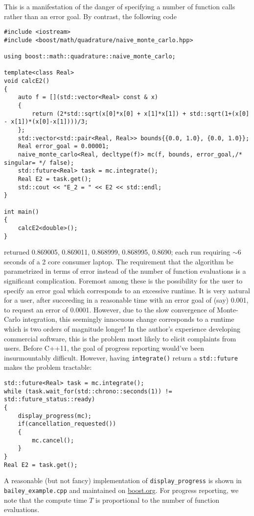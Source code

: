 \documentclass{ansarticle}
\begin{document}
This is a manifestation of the danger of specifying a number of function calls rather than an error goal.
By contrast, the following code
\begin{verbatim}
#include <iostream>
#include <boost/math/quadrature/naive_monte_carlo.hpp>

using boost::math::quadrature::naive_monte_carlo;

template<class Real>
void calcE2()
{
    auto f = [](std::vector<Real> const & x)
    {
        return (2*std::sqrt(x[0]*x[0] + x[1]*x[1]) + std::sqrt(1+(x[0] - x[1])*(x[0]-x[1])))/3;
    };
    std::vector<std::pair<Real, Real>> bounds{{0.0, 1.0}, {0.0, 1.0}};
    Real error_goal = 0.00001;
    naive_monte_carlo<Real, decltype(f)> mc(f, bounds, error_goal,/* singular= */ false);
    std::future<Real> task = mc.integrate();
    Real E2 = task.get();
    std::cout << "E_2 = " << E2 << std::endl;
}

int main()
{
    calcE2<double>();
}
\end{verbatim}
returned 0.869005, 0.869011, 0.868999, 0.868995, 0.8690; each run requiring ${\sim}6$ seconds of a 2 core consumer laptop.
The requirement that the algorithm be parametrized in terms of error instead of the number of function evaluations is a significant complication.
Foremost among these is the possibility for the user to specify an error goal which corresponds to an excessive runtime.
It is very natural for a user, after succeeding in a reasonable time with an error goal of (say) 0.001, to request an error of 0.0001.
However, due to the slow convergence of Monte-Carlo integration, this seemingly innocuous change corresponds to a runtime which is two orders of magnitude longer!
In the author's experience developing commercial software, this is the problem most likely to elicit complaints from users.
Before C++11, the goal of progress reporting would've been insurmountably difficult.
However, having \texttt{integrate()} return a \texttt{std::future} makes the problem tractable:
\begin{verbatim}
std::future<Real> task = mc.integrate();
while (task.wait_for(std::chrono::seconds(1)) != std::future_status::ready)
{
    display_progress(mc);
    if(cancellation_requested())
    {
        mc.cancel();
    }
}
Real E2 = task.get();
\end{verbatim}
A reasonable (but not fancy) implementation of \texttt{display_progress} is shown in \texttt{bailey_example.cpp} and maintained on \href{boost.org}{boost.org}.
For progress reporting, we note that the compute time $T$ is proportional to the number of function evaluations.
\end{document}
